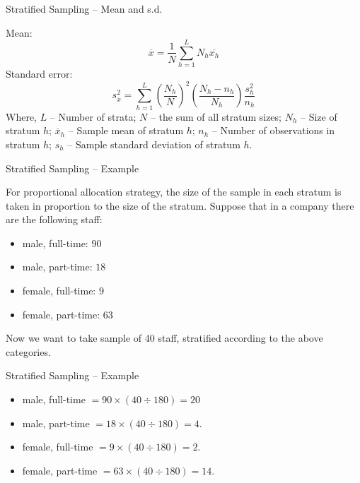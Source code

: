 \begin{frame}{Stratified Sampling -- Mean and s.d.}

Mean:\\
\[\overline{x}=\frac{1}{N} \sum_{h=1}^{L} N_{h} \overline{x_{h}}\]
Standard error:\\
\[s_{\overline{x}}^{2}=\sum_{h=1}^{L}\left(\frac{N_{h}}{N}\right)^{2}\left(\frac{N_{h}-n_{h}}{N_{h}}\right) \frac{s_{h}^{2}}{n_{h}}\]
Where, $L$ -- Number of strata; $N$ -- the sum of all stratum sizes; $N_{h}$ -- Size of stratum $h$; $\overline{x}_{h}$ -- Sample mean of stratum $h$; $n_{h}$ -- Number of observations in stratum $h$; $s_{h}$ -- Sample standard deviation of stratum $h$.

\end{frame}

\begin{frame}{Stratified Sampling -- Example}

For proportional allocation strategy, the size of the sample in each stratum is taken in proportion to the size of the stratum. Suppose that in a company there are the following staff:
\begin{itemize}

\item male, full-time: $90$
\item male, part-time: $18$
\item female, full-time: $9$
\item female, part-time: $63$
\end{itemize}
Now we want to take sample of 40 staff, stratified according to the above categories.

\end{frame}

\begin{frame}{Stratified Sampling -- Example}
\begin{itemize}

\item male, full-time $=90 \times(40 \div 180)=20$
\item male, part-time $=18 \times(40 \div 180)=4$.
\item female, full-time $=9 \times(40 \div 180)=2$.
\item female, part-time $=63 \times(40 \div 180)=14$.
\end{itemize}

\end{frame}

